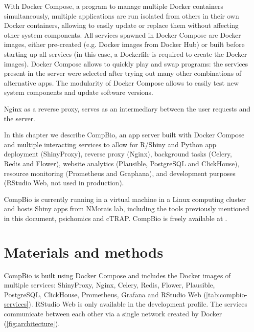 With Docker Compose, a program to manage multiple Docker containers simultaneously, multiple applications are run isolated from others in their own Docker containers, allowing to easily update or replace them without affecting other system components. All services spawned in Docker Compose are Docker images, either pre-created (e.g.  Docker images from Docker Hub) or built before starting up all services (in this case, a Dockerfile is required to create the Docker images). Docker Compose allows to quickly play and swap programs: the services present in the server were selected after trying out many other combinations of alternative apps. The modularity of Docker Compose allows to easily test new system components and update software versions.

Nginx as a reverse proxy, serves as an intermediary between the user requests and the server.

In this chapter we describe CompBio, an app server built with Docker Compose and multiple interacting services to allow for R/Shiny and Python app deployment (ShinyProxy), reverse proxy (Nginx), background tasks (Celery, Redis and Flower), website analytics (Plausible, PostgreSQL and ClickHouse), resource monitoring (Prometheus and Graphana), and development purposes (RStudio Web, not used in production).

CompBio is currently running in a virtual machine in a Linux computing cluster and hosts Shiny apps from NMorais lab, including the tools previously mentioned in this document, psichomics and cTRAP. CompBio is freely available at .

\section{Materials and methods}

CompBio is built using Docker Compose and includes the Docker images of multiple services: ShinyProxy, Nginx, Celery, Redis, Flower, Plausible, PostgreSQL, ClickHouse, Prometheus, Grafana and RStudio Web (\autoref{tab:compbio-services}). 
RStudio Web is only available in the development profile. The services communicate between each other via a single network created by Docker (\autoref{fig:architecture}).

